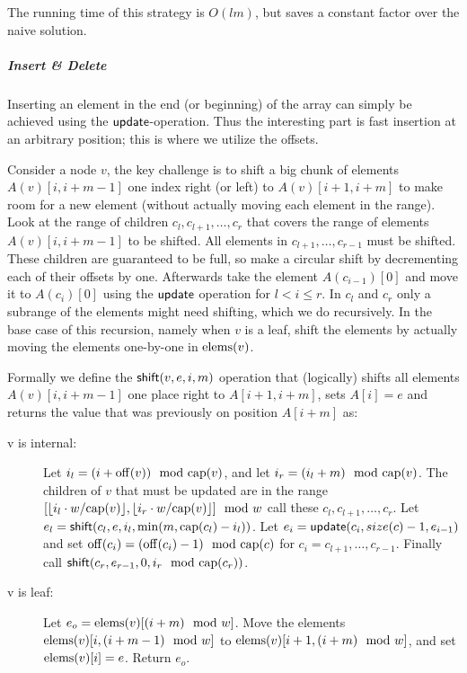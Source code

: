 The running time of this strategy is $O(lm)$, but saves a constant factor over the naive solution.


\subparagraph*{Insert \& Delete}

Inserting an element in the end (or beginning) of the array can simply be
achieved using the $\mathsf{update}$-operation. Thus the interesting part is fast insertion at an arbitrary position;
this is where we utilize the offsets.

Consider a node $v$, the key challenge is to shift a big chunk of elements $A(v)[i, i+m-1]$ one index right (or left) to $A(v)[i+1, i+m]$ to make room for a new element (without actually moving each element in the range). Look at the range of children $c_l, c_{l+1}, \ldots, c_r$ that covers the range of elements $A(v)[i, i+m-1]$ to be shifted. All elements in $c_{l+1}, \ldots, c_{r-1}$ must be shifted. These children are guaranteed to be full, so make a circular shift by decrementing each of their offsets by one. Afterwards take the element $A(c_{i-1})[0]$ and move it to $A(c_{i})[0]$ using the $\mathsf{update}$ operation for $l < i \leq r$. In $c_l$ and $c_r$ only a subrange of the elements might need shifting, which we do recursively. In the base case of this recursion, namely when
$v$ is a leaf, shift the elements by actually moving the elements one-by-one in $\mathrm{elems}(v)$.

Formally we define the $\mathsf{shift}(v, e, i, m)$ operation that (logically) shifts
all elements $A(v)[i, i+m-1]$ one place right to $A[i+1, i+m]$, sets $A[i] = e$ and returns the value that was previously on position $A[i+m]$ as:

\begin{description} \item[\quad v is internal:] Let $i_l = (i + \mathrm{off}(v)) \mod
    {\mathrm{cap}}(v)$, and let $i_r = (i_l + m) \mod {\mathrm{cap}}(v)$. The children of
    $v$ that must be updated are in the range $[\lfloor i_l \cdot w / \mathrm{cap}(v) \rfloor, \lfloor i_r \cdot w / \mathrm{cap}(v) \rfloor] \mod w$ call these $c_l, c_{l+1}, \ldots, c_r$.
Let $e_l = \mathsf{shift}(c_l, e, i_l, \min(m, \mathrm{cap}(c_l) - i_l))$. Let $e_i =
\mathsf{update}(c_i, size(c) - 1, e_{i-1})$ and set $\mathrm{off}(c_i) = (\mathrm{off}(c_i) - 1)
\mod {\mathrm{cap}}(c)$ for $c_i = c_{l+1}, \ldots, c_{r-1}$. Finally call
$\mathsf{shift}(c_r, e_{r-1}, 0, i_r \mod {\mathrm{cap}}(c_r))$.
	
        \item[\quad v is leaf:] Let $e_o = \mathrm{elems}(v)[(i+m) \mod w]$. Move the
            elements $\mathrm{elems}(v)[i, (i+m-1) \mod w]$ to $\mathrm{elems}(v)[i+1,(i+m) \mod w]$, and set $\mathrm{elems}(v)[i] = e$. Return $e_o$.
    \end{description}

